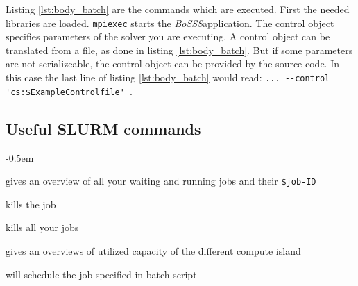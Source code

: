 \documentclass[11pt,twoside,a4paper]{fdyartcl}
\newcommand{\Bosss}{\textit{BoSSS}}
\begin{document}
Listing \ref{lst:body_batch} are the commands which are executed. First the needed libraries are loaded. \verb|mpiexec| starts the \Bosss application. The control object specifies parameters of the solver you are executing. A control object can be translated from a file, as done in listing \ref{lst:body_batch}. But if some parameters are not serializeable, the control object can be provided by the source code. In this case the last line of listing \ref{lst:body_batch} would read: \verb|... --control 'cs:$ExampleControlfile' |.

\subsection{Useful SLURM commands}
\label{sec:lsf_commands}

\begin{description}
\itemsep-0.5em 
\item [sjobs] gives an overview of all your waiting and running jobs and their \verb|$job-ID|
\item [scancel job-ID] kills the job
\item [scancel -u \$TuID] kills all your jobs
\item [squeue] gives an overviews of utilized capacity of the different compute island
\item [sbatch batch.sh] will schedule the job specified in batch-script
\end{description}
\end{document}
